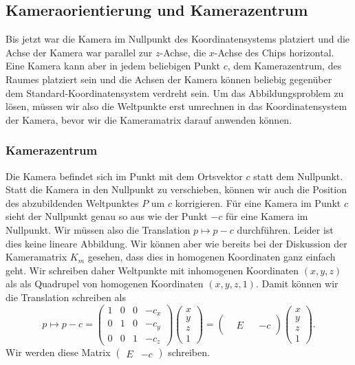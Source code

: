 %
%
%
\subsection{Kameraorientierung und Kamerazentrum\label{section:kameraorientierung}}
Bis jetzt war die Kamera im Nullpunkt des Koordinatensystems platziert
und die Achse der Kamera war parallel zur $z$-Achse, die $x$-Achse des Chips
horizontal.
Eine Kamera kann aber in jedem beliebigen Punkt $c$, dem Kamerazentrum,
des Raumes platziert sein und die Achsen der Kamera können beliebig gegenüber
dem Standard-Koordinatensystem verdreht sein.
Um das Abbildungsproblem zu lösen, müssen wir also die Weltpunkte erst
umrechnen in das Koordinatensystem der Kamera, bevor wir die Kameramatrix
darauf anwenden können.

\subsubsection{Kamerazentrum}
Die Kamera befindet sich im Punkt mit dem Ortsvektor $c$ statt dem
Nullpunkt.
Statt die Kamera in den Nullpunkt zu verschieben, können wir auch die
Position des abzubildenden Weltpunktes $P$ um $c$ korrigieren.
Für eine Kamera im Punkt $c$ sieht der Nullpunkt genau so aus wie
der Punkt $-c$ für eine Kamera im Nullpunkt.
Wir müssen also die Translation $p\mapsto p-c$ durchführen.
Leider ist dies keine lineare Abbildung.
Wir können aber wie bereits bei der Diskussion der Kameramatrix $K_m$
gesehen, dass dies in homogenen Koordinaten ganz einfach geht.
Wir schreiben daher Weltpunkte mit inhomogenen Koordinaten
$(x,y,z)$ als als Quadrupel von homogenen Koordinaten $(x,y,z,1)$.
Damit können wir die Translation schreiben als
\[
p \mapsto p-c =
\begin{pmatrix}
1&0&0&-c_x\\
0&1&0&-c_y\\
0&0&1&-c_z
\end{pmatrix}
\begin{pmatrix}
x\\y\\z\\1
\end{pmatrix}
=
\begin{pmatrix}
& & &  \\
&E& &-c\\
& & &  
\end{pmatrix}
\begin{pmatrix}
x\\y\\z\\1
\end{pmatrix}.
\]
Wir werden diese Matrix $\begin{pmatrix}E&-c\end{pmatrix}$ schreiben.

